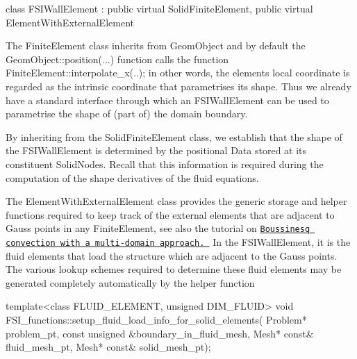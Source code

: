 \begin{DoxyCode}
\textcolor{keyword}{class }FSIWallElement : \textcolor{keyword}{public} \textcolor{keyword}{virtual} SolidFiniteElement, 
                       \textcolor{keyword}{public} \textcolor{keyword}{virtual} ElementWithExternalElement
\end{DoxyCode}


The {\ttfamily Finite\+Element} class inherits from {\ttfamily Geom\+Object} and by default the {\ttfamily Geom\+Object\+::position}(...) function calls the function {\ttfamily Finite\+Element\+::interpolate\+\_\+x}(..); in other words, the element\textquotesingle{}s local coordinate is regarded as the intrinsic coordinate that parametrises its shape. Thus we already have a standard interface through which an {\ttfamily F\+S\+I\+Wall\+Element} can be used to parametrise the shape of (part of) the domain boundary.

By inheriting from the {\ttfamily Solid\+Finite\+Element} class, we establish that the shape of the {\ttfamily F\+S\+I\+Wall\+Element} is determined by the positional {\ttfamily Data} stored at its constituent {\ttfamily Solid\+Nodes}. Recall that this information is required during the computation of the shape derivatives of the fluid equations.

The {\ttfamily Element\+With\+External\+Element} class provides the generic storage and helper functions required to keep track of the external elements that are adjacent to Gauss points in any {\ttfamily Finite\+Element}, see also the tutorial on \href{../../../multi_physics/multi_domain_ref_b_convect/html/index.html}{\tt Boussinesq convection with a multi-\/domain approach. } In the {\ttfamily F\+S\+I\+Wall\+Element}, it is the fluid elements that load the structure which are adjacent to the Gauss points. The various lookup schemes required to determine these fluid elements may be generated completely automatically by the helper function


\begin{DoxyCode}
\textcolor{keyword}{template}<\textcolor{keyword}{class} FLUID\_ELEMENT, \textcolor{keywordtype}{unsigned} DIM\_FLUID>
\textcolor{keywordtype}{void} FSI\_functions::setup\_fluid\_load\_info\_for\_solid\_elements(
     Problem* problem\_pt,
     \textcolor{keyword}{const} \textcolor{keywordtype}{unsigned} &boundary\_in\_fluid\_mesh,
     Mesh* \textcolor{keyword}{const}& fluid\_mesh\_pt,
     Mesh* \textcolor{keyword}{const}& solid\_mesh\_pt);
\end{DoxyCode}


